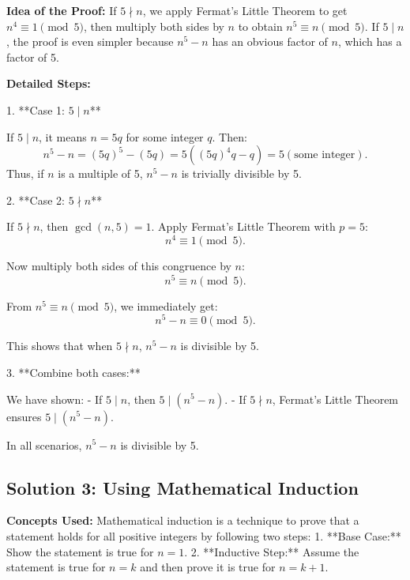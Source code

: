 \documentclass[12pt,a4paper]{article}
\begin{document}
\noindent\textbf{Idea of the Proof:}  
If $5 \nmid n$, we apply Fermat’s Little Theorem to get $n^4 \equiv 1 \pmod{5}$, then multiply both sides by $n$ to obtain $n^5 \equiv n \pmod{5}$. If $5 \mid n$, the proof is even simpler because $n^5-n$ has an obvious factor of $n$, which has a factor of 5.

\medskip

\noindent\textbf{Detailed Steps:}

1. **Case 1: $5 \mid n$**

\medskip
   
   If $5 \mid n$, it means $n=5q$ for some integer $q$. Then:
   \[
   n^5-n = (5q)^5 - (5q) = 5( (5q)^4q - q ) = 5(\text{some integer}).
   \]
   Thus, if $n$ is a multiple of 5, $n^5-n$ is trivially divisible by 5.

\medskip

2. **Case 2: $5 \nmid n$**

\medskip
   
   If $5 \nmid n$, then $\gcd(n,5)=1$. Apply Fermat's Little Theorem with $p=5$:
   \[
   n^4 \equiv 1 \pmod{5}.
   \]

   Now multiply both sides of this congruence by $n$:
   \[
   n^5 \equiv n \pmod{5}.
   \]

   From $n^5 \equiv n \pmod{5}$, we immediately get:
   \[
   n^5 - n \equiv 0 \pmod{5}.
   \]

   This shows that when $5 \nmid n$, $n^5-n$ is divisible by 5.

\medskip

3. **Combine both cases:**

\medskip
   
   We have shown:
   - If $5 \mid n$, then $5 \mid (n^5-n)$.
   - If $5 \nmid n$, Fermat's Little Theorem ensures $5 \mid (n^5-n)$.

   In all scenarios, $n^5-n$ is divisible by 5.

\bigskip

\subsection*{Solution 3: Using Mathematical Induction}

\noindent\textbf{Concepts Used:}  
Mathematical induction is a technique to prove that a statement holds for all positive integers by following two steps:
1. **Base Case:** Show the statement is true for $n=1$.
2. **Inductive Step:** Assume the statement is true for $n=k$ and then prove it is true for $n=k+1$.
\end{document}
